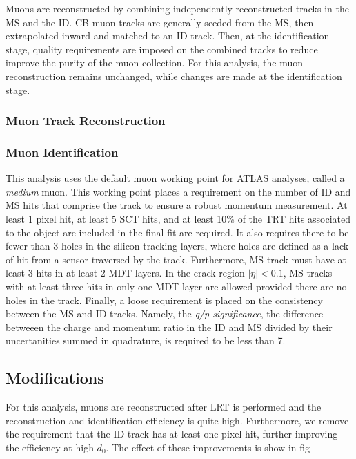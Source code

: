 Muons are reconstructed by combining independently reconstructed tracks in the \ac{MS} and the \ac{ID}. \ac{CB} muon tracks are generally seeded from the \ac{MS}, then extrapolated inward and matched to an \ac{ID} track. Then, at the identification stage, quality requirements are imposed on the combined tracks to reduce improve the purity of the muon collection. For this analysis, the muon reconstruction remains unchanged, while changes are made at the identification stage. 

\subsubsection{Muon Track Reconstruction}

\subsubsection{Muon Identification}

This analysis uses the default muon working point for ATLAS analyses, called a \emph{medium} muon. This working point places a requirement on the number of \ac{ID} and \ac{MS} hits that comprise the track to ensure a robust momentum measurement. At least 1 pixel hit, at least 5 \ac{SCT} hits, and at least 10\% of the \ac{TRT} hits associated to the object are included in the final fit are required. It also requires there to be fewer than 3 holes in the silicon tracking layers, where holes are defined as a lack of hit from a sensor traversed by the track. Furthermore, \ac{MS} track must have at least 3 hits in at least 2 \ac{MDT} layers. In the crack region $|\eta| < 0.1$, \ac{MS} tracks with at least three hits in only one \ac{MDT} layer are allowed provided there are no holes in the track. Finally, a loose requirement is placed on the consistency between the \ac{MS} and \ac{ID} tracks. Namely, the \emph{q/p significance}, the difference betweeen the charge and momentum ratio in the \ac{ID} and \ac{MS} divided by their uncertanities summed in quadrature, is required to be less than 7. 



\subsection{Modifications}

For this analysis, muons are reconstructed after \ac{LRT} is performed and the reconstruction and identification efficiency is quite high. Furthermore, we remove the requirement that the \ac{ID} track has at least one pixel hit, further improving the efficiency at high $d_{0}$. The effect of these improvements is show in fig %


